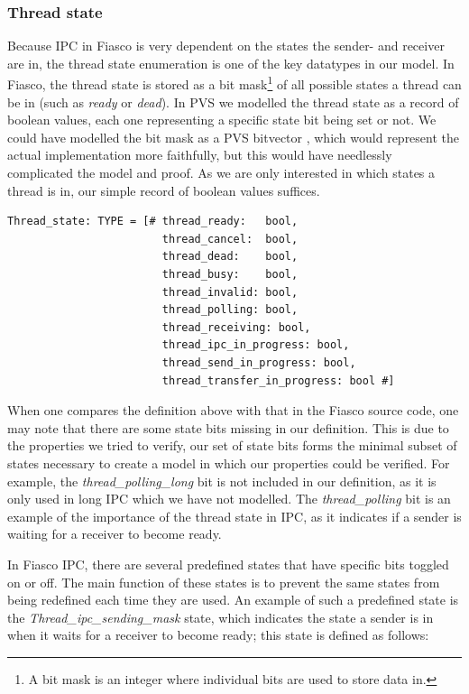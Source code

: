 \subsubsection{Thread state}
Because IPC in Fiasco is very dependent on the states the sender- and receiver are in, the thread state enumeration is one of the key datatypes in our model. In Fiasco, the thread state is stored as a bit mask\footnote{A bit mask is an integer where individual bits are used to store data in.} of all possible states a thread can be in (such as \emph{ready} or \emph{dead}). In PVS we modelled the thread state as a record of boolean values, each one representing a specific state bit being set or not. We could have modelled the bit mask as a PVS bitvector \cite{butler97bitvector}, which would represent the actual implementation more faithfully, but this would have needlessly complicated the model and proof. As we are only interested in which states a thread is in, our simple record of boolean values suffices.

\lstset{language=PVS}
\begin{lstlisting}[caption={PVS: thread state definition.}]
Thread_state: TYPE = [# thread_ready:   bool,
                        thread_cancel:  bool,
                        thread_dead:    bool,
                        thread_busy:    bool,
                        thread_invalid: bool,
                        thread_polling: bool,
                        thread_receiving: bool,
                        thread_ipc_in_progress: bool,
                        thread_send_in_progress: bool,
                        thread_transfer_in_progress: bool #]
\end{lstlisting}

When one compares the definition above with that in the Fiasco source code, one may note that there are some state bits missing in our definition. This is due to the properties we tried to verify, our set of state bits forms the minimal subset of states necessary to create a model in which our properties could be verified. For example, the \emph{thread\_polling\_long} bit is not included in our definition, as it is only used in long IPC which we have not modelled. The \emph{thread\_polling} bit is an example of the importance of the thread state in IPC, as it indicates if a sender is waiting for a receiver to become ready.\emptyline

In Fiasco IPC, there are several predefined states that have specific bits toggled on or off. The main function of these states is to prevent the same states from being redefined each time they are used. An example of such a predefined state is the \emph{Thread\_ipc\_sending\_mask} state, which indicates the state a sender is in when it waits for a receiver to become ready; this state is defined as follows:

